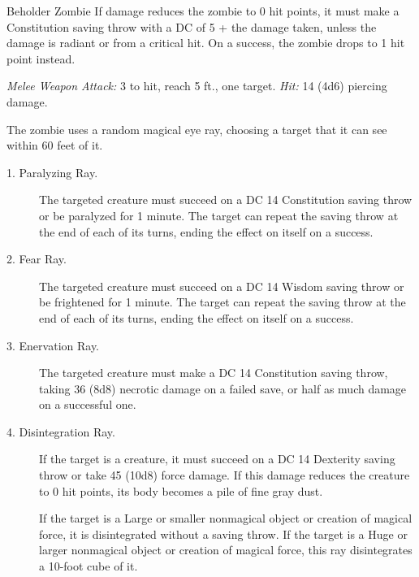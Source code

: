 \documentclass[10pt,a4paper,twoside,bg=print,twocolumn,openany,nodeprecatedcode]{dndbook}
\begin{document}
\begin{DndMonster}[float=t]{Beholder Zombie}
\DndMonsterBasics[
armor-class = {15 (natural armor)},
hit-points = {\DndDice{11d10 + 33}},
speed = {0 ft., fly 20 ft. \textit{(hover)}}
]
\DndMonsterAbilityScores[
 str = 10,
 dex = 8,
 con = 16,
 int = 3,
 wis = 8,
 cha = 5
]
\DndMonsterDetails[
saving-throws = {Wis +2},
damage-immunities = {poison},
condition-immunities = {poisoned, prone},
senses = {darkvision 60 ft., passive perception 9},
languages = {understands Deep Speech and Undercommon but can't speak},
challenge = 5,
]
If damage reduces the zombie to 0 hit points, it must make a Constitution saving throw with a DC of 5 + the damage taken, unless the damage is radiant or from a critical hit. On a success, the zombie drops to 1 hit point instead.

\textsl{Melee Weapon Attack:} 3 to hit, reach 5 ft., one target. \textsl{Hit:} 14 (4d6) piercing damage.

The zombie uses a random magical eye ray, choosing a target that it can see within 60 feet of it.


\begin{description}
\item[1. Paralyzing Ray.]
The targeted creature must succeed on a DC 14 Constitution saving throw or be paralyzed for 1 minute. The target can repeat the saving throw at the end of each of its turns, ending the effect on itself on a success.
\item[2. Fear Ray.]
The targeted creature must succeed on a DC 14 Wisdom saving throw or be frightened for 1 minute. The target can repeat the saving throw at the end of each of its turns, ending the effect on itself on a success.
\item[3. Enervation Ray.]
The targeted creature must make a DC 14 Constitution saving throw, taking 36 (8d8) necrotic damage on a failed save, or half as much damage on a successful one.
\item[4. Disintegration Ray.]
If the target is a creature, it must succeed on a DC 14 Dexterity saving throw or take 45 (10d8) force damage. If this damage reduces the creature to 0 hit points, its body becomes a pile of fine gray dust.

If the target is a Large or smaller nonmagical object or creation of magical force, it is disintegrated without a saving throw. If the target is a Huge or larger nonmagical object or creation of magical force, this ray disintegrates a 10-foot cube of it.

\end{description}

\end{DndMonster}
\end{document}
